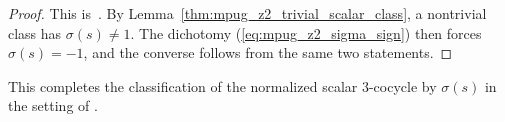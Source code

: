 \begin{proof}\leanok
    This is~\cite[``Nontrivial scalar gauge class for
        $\Z_2$'']{QICLean2026Blueprint}.
    By Lemma~\ref{thm:mpug_z2_trivial_scalar_class}, a nontrivial class has
    $\sigma(s)\neq1$. The dichotomy
    (\ref{eq:mpug_z2_sigma_sign}) then forces $\sigma(s)=-1$, and the converse
    follows from the same two statements.
\end{proof}

This completes the classification of the normalized scalar $3$-cocycle by
$\sigma(s)$ in the setting of \cite[lines~5207--5338]{FrancoRubio2025MPUGauging}.
